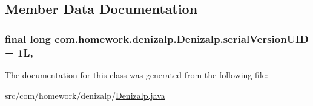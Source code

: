 \subsection{Member Data Documentation}
\subsubsection[{\texorpdfstring{serial\+Version\+U\+ID}{serialVersionUID}}]{\setlength{\rightskip}{0pt plus 5cm}final long com.\+homework.\+denizalp.\+Denizalp.\+serial\+Version\+U\+ID = 1L\hspace{0.3cm}{\ttfamily [static]}, {\ttfamily [private]}}\hypertarget{classcom_1_1homework_1_1denizalp_1_1_denizalp_a0ba32279227f2b418ea1da8996859de8}{}\label{classcom_1_1homework_1_1denizalp_1_1_denizalp_a0ba32279227f2b418ea1da8996859de8}


The documentation for this class was generated from the following file\+:\begin{DoxyCompactItemize}
\item 
src/com/homework/denizalp/\hyperlink{_denizalp_8java}{Denizalp.\+java}\end{DoxyCompactItemize}

